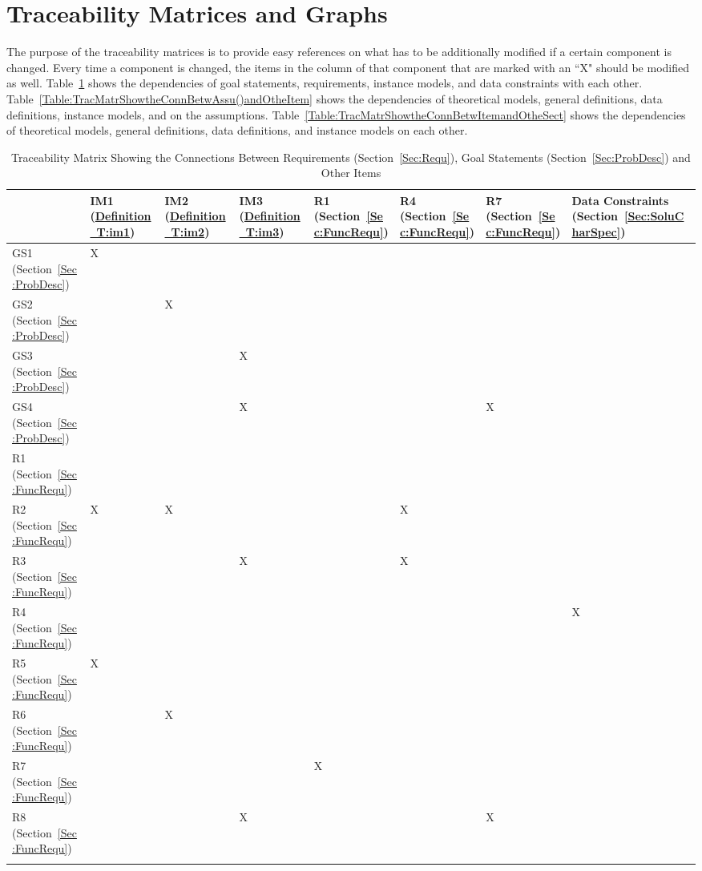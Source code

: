 \documentclass[12pt]{article}
\begin{document}
\section{Traceability Matrices and Graphs}
\label{Sec:TracMatrandGrap}
The purpose of the traceability matrices is to provide easy references on what has to be additionally modified if a certain component is changed. Every time a component is changed, the items in the column of that component that are marked with an ``X" should be modified as well. Table~\ref{Table:TracMatrShowtheConnBetwRequ()GoalStat()andOtheItem} shows the dependencies of goal statements, requirements, instance models, and data constraints with each other. Table~\ref{Table:TracMatrShowtheConnBetwAssu()andOtheItem} shows the dependencies of theoretical models, general definitions, data definitions, instance models, and on the assumptions. Table~\ref{Table:TracMatrShowtheConnBetwItemandOtheSect} shows the dependencies of theoretical models, general definitions, data definitions, and instance models on each other.
\begin{longtable}{l l l l l l l l}
\toprule
 & IM1 (\hyperref[T:im1]{Definition~T:im1}) & IM2 (\hyperref[T:im2]{Definition~T:im2}) & IM3 (\hyperref[T:im3]{Definition~T:im3}) & R1 (Section~\ref{Sec:FuncRequ}) & R4 (Section~\ref{Sec:FuncRequ}) & R7 (Section~\ref{Sec:FuncRequ}) & Data Constraints (Section~\ref{Sec:SoluCharSpec})
\\
\midrule
GS1 (Section~\ref{Sec:ProbDesc}) & X &  &  &  &  &  & 
\\
GS2 (Section~\ref{Sec:ProbDesc}) &  & X &  &  &  &  & 
\\
GS3 (Section~\ref{Sec:ProbDesc}) &  &  & X &  &  &  & 
\\
GS4 (Section~\ref{Sec:ProbDesc}) &  &  & X &  &  & X & 
\\
R1 (Section~\ref{Sec:FuncRequ}) &  &  &  &  &  &  & 
\\
R2 (Section~\ref{Sec:FuncRequ}) & X & X &  &  & X &  & 
\\
R3 (Section~\ref{Sec:FuncRequ}) &  &  & X &  & X &  & 
\\
R4 (Section~\ref{Sec:FuncRequ}) &  &  &  &  &  &  & X
\\
R5 (Section~\ref{Sec:FuncRequ}) & X &  &  &  &  &  & 
\\
R6 (Section~\ref{Sec:FuncRequ}) &  & X &  &  &  &  & 
\\
R7 (Section~\ref{Sec:FuncRequ}) &  &  &  & X &  &  & 
\\
R8 (Section~\ref{Sec:FuncRequ}) &  &  & X &  &  & X & 
\\
\bottomrule
\caption{Traceability Matrix Showing the Connections Between Requirements (Section~\ref{Sec:Requ}), Goal Statements (Section~\ref{Sec:ProbDesc}) and Other Items}
\label{Table:TracMatrShowtheConnBetwRequ()GoalStat()andOtheItem}
\end{longtable}
\end{document}
